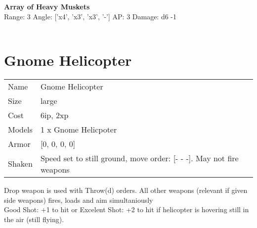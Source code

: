 {\bf Array of Heavy Muskets } \\



Range: 3  Angle: ['x4', 'x3', 'x3', '-'] AP: 3 Damage: d6 -1 \\




 
\ \\













\clearpage

\section{ Gnome Helicopter }

\begin{tabular}{ll}
  Name & Gnome Helicopter \\
  Size & large\\
  Cost & 6ip, 2xp\\
  Models & 1 x Gnome Helicpoter\\
  Armor & [0, 0, 0, 0]\\
  Shaken & Speed set to still ground, move order: [- - -]. May not fire weapons\\
\end{tabular}

\noindent Drop weapon is used with Throw(d) orders. All other weapons (relevant if given side weapons) fires, loads and aim simultaniously\\ 
Good Shot: +1 to hit or Excelent Shot: +2 to hit if helicopter is hovering still in the air (still flying).\\ 


